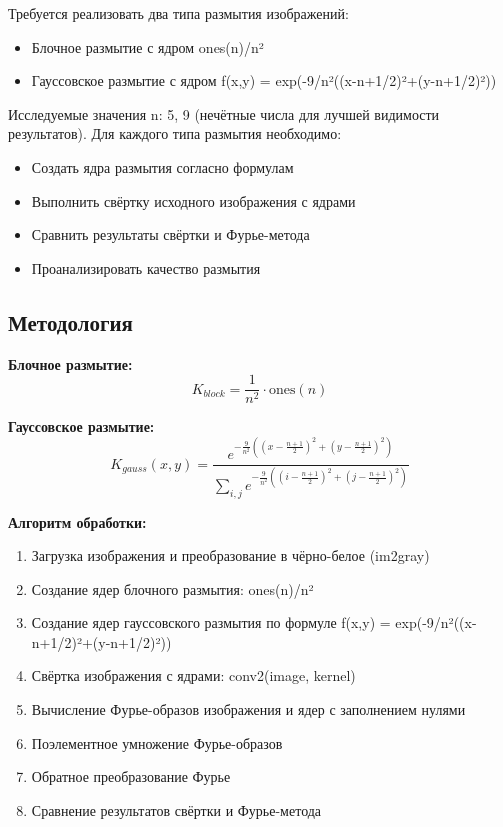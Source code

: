 Требуется реализовать два типа размытия изображений:
\begin{itemize}
    \item Блочное размытие с ядром ones(n)/n²
    \item Гауссовское размытие с ядром f(x,y) = exp(-9/n²((x-n+1/2)²+(y-n+1/2)²))
\end{itemize}

Исследуемые значения n: 5, 9 (нечётные числа для лучшей видимости результатов). Для каждого типа размытия необходимо:
\begin{itemize}
    \item Создать ядра размытия согласно формулам
    \item Выполнить свёртку исходного изображения с ядрами
    \item Сравнить результаты свёртки и Фурье-метода
    \item Проанализировать качество размытия
\end{itemize}

\subsection*{Методология}

\textbf{Блочное размытие:}
\begin{equation}
K_{block} = \frac{1}{n^2} \cdot \text{ones}(n)
\end{equation}

\textbf{Гауссовское размытие:}
\begin{equation}
K_{gauss}(x,y) = \frac{e^{-\frac{9}{n^2}\left((x-\frac{n+1}{2})^2 + (y-\frac{n+1}{2})^2\right)}}{\sum_{i,j} e^{-\frac{9}{n^2}\left((i-\frac{n+1}{2})^2 + (j-\frac{n+1}{2})^2\right)}}
\end{equation}

\textbf{Алгоритм обработки:}
\begin{enumerate}
    \item Загрузка изображения и преобразование в чёрно-белое (im2gray)
    \item Создание ядер блочного размытия: ones(n)/n²
    \item Создание ядер гауссовского размытия по формуле f(x,y) = exp(-9/n²((x-n+1/2)²+(y-n+1/2)²))
    \item Свёртка изображения с ядрами: conv2(image, kernel)
    \item Вычисление Фурье-образов изображения и ядер с заполнением нулями
    \item Поэлементное умножение Фурье-образов
    \item Обратное преобразование Фурье
    \item Сравнение результатов свёртки и Фурье-метода
\end{enumerate}

